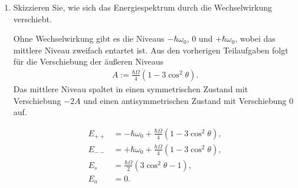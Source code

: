 \documentclass[11pt,a4paper]{scrartcl}
\begin{document}
\begin{enumerate}[label=(\alph*)]
\begin{calculationbox}
\begin{calculationbox}[title=Störmatrix und Diagonalisierung]
                \begin{solutionbox}[title=Aufgespaltene Zustände und Verschiebungen]
                    \begin{align*}
                        \ket{\psi_s}
                        =
                        \frac{1}{\sqrt2}(\ket{+-}+\ket{-+}),
                        \qquad
                        \Delta E_s^{(1)}
                        =
                        2B
                        =
                        \frac{\hbar\Omega}{2}(3\cos^2\theta-1),\\[0.6em]
                        \ket{\psi_a}
                        =
                        \frac{1}{\sqrt2}(\ket{+-}-\ket{-+}),
                        \qquad
                        \Delta E_a^{(1)}=0.
                    \end{align*}
                \end{solutionbox}
            \end{calculationbox}
        \end{calculationbox}

        \item Skizzieren Sie, wie sich das Energiespektrum durch die Wechselwirkung verschiebt.

        \begin{calculationbox}
            Ohne Wechselwirkung gibt es die Niveaus $-\hbar\omega_0$, $0$ und $+\hbar\omega_0$, wobei das mittlere Niveau zweifach entartet ist. Aus den vorherigen Teilaufgaben folgt für die Verschiebung der äußeren Niveaus
            \begin{align*}
                A:=\frac{\hbar\Omega}{4}(1-3\cos^2\theta).
            \end{align*}
            Das mittlere Niveau spaltet in einen symmetrischen Zustand mit Verschiebung $-2A$ und einen antisymmetrischen Zustand mit Verschiebung $0$ auf.

            \begin{solutionbox}[title=Gestörtes Spektrum bis erster Ordnung]
                \begin{align*}
                    E_{++}
                    &=
                    -\hbar\omega_0
                    +
                    \frac{\hbar\Omega}{4}(1-3\cos^2\theta),\\
                    E_{--}
                    &=
                    +\hbar\omega_0
                    +
                    \frac{\hbar\Omega}{4}(1-3\cos^2\theta),\\
                    E_s
                    &=
                    \frac{\hbar\Omega}{2}(3\cos^2\theta-1),\\
                    E_a
                    &=
                    0.
                \end{align*}
            \end{solutionbox}


\end{calculationbox}
\end{enumerate}
\end{document}

